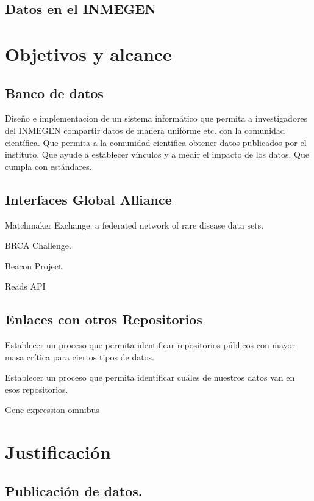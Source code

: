 \documentclass[
10pt, %
letterpaper, %
oneside, %
headinclude,footinclude, %
BCOR5mm, %
]{scrartcl}
\begin{document}
\subsection{Datos en el INMEGEN}


\section{Objetivos y alcance}


\subsection{Banco de datos}

Diseño e implementacion de un sistema informático que permita a
investigadores del INMEGEN compartir datos de manera uniforme etc. con
la comunidad científica. Que permita a la comunidad científica obtener
datos publicados por el instituto. Que ayude a establecer vínculos y a
medir el impacto de los datos. Que cumpla con estándares.
\cite{_data_????}
\cite{altman_proposed_2007}


\subsection{Interfaces Global Alliance}

Matchmaker Exchange: a federated network of rare disease data sets.

BRCA Challenge.

Beacon Project.

Reads API


\subsection{Enlaces con otros Repositorios}
Establecer un proceso que permita identificar repositorios públicos
con mayor masa crítica para ciertos tipos de datos.

Establecer un proceso que permita identificar cuáles de nuestros datos
van en esos repositorios.
\cite{_genebank_????}
\cite{king_introduction_2007}

Gene expression omnibus

\section{Justificación}

\subsection{Publicación de datos.}
\end{document}
